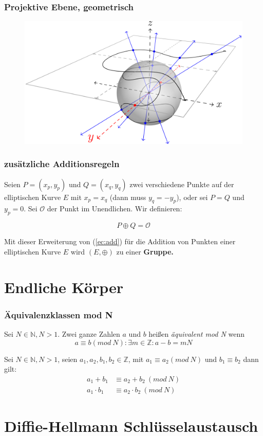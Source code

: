 \documentclass{beamer}
\begin{document}
\begin{frame}
  \frametitle{Projektive Ebene, geometrisch}
  \begin{figure}
    \includegraphics[height=0.57\textwidth]{ell-curve-projective.png}
  \end{figure}
\end{frame}
\begin{frame}
  \frametitle{zusätzliche Additionsregeln}
  \begin{definition}
    Seien $P = (x_p, y_p)$ und $Q =(x_q, y_q)$ zwei verschiedene Punkte auf der
    elliptischen Kurve $E$ mit $x_p = x_q$ (dann muss $y_q = -y_p$),
    oder sei $P = Q$ und $y_p = 0$.
    Sei $\mathcal{O}$ der Punkt im Unendlichen. Wir definieren:

    $$ P \oplus Q = \mathcal{O} $$
  \end{definition}
  \begin{Theorem}
    Mit dieser Erweiterung von (\ref{ec:add}) für die Addition von Punkten einer
    elliptischen Kurve $E$ wird $(E, \oplus)$ zu einer \bf{Gruppe}.
  \end{Theorem}
\end{frame}

\section{Endliche Körper}
\begin{frame}
  \frametitle{Äquivalenzklassen mod N}
  \begin{definition}
    Sei $N \in \mathbb{N}, N > 1$. Zwei ganze Zahlen $a$ und $b$ heißen
    \emph{äquivalent mod N} wenn
    $$ a \equiv b (mod\ N): \exists m \in \mathbb{Z}: a-b = mN $$
  \end{definition}

  \begin{lemma}
    Sei $N \in \mathbb{N}, N > 1$, seien $a_1, a_2, b_1, b_2 \in \mathbb{Z}$,
    mit $a_1 \equiv a_2 (mod\ N)$ und $b_1 \equiv b_2$  dann gilt:
    \begin{equation}
      \begin{split}
        \label{op:mod}
        a_1 + b_1 & \equiv  a_2 + b_2 \ (mod\ N) \\
        a_1 \cdot b_1 & \equiv  a_2 \cdot b_2 \ (mod\ N)
      \end{split}
    \end{equation}
  \end{lemma}
\end{frame}

\section{Diffie-Hellmann Schlüsselaustausch}
\begin{frame}
  \tableofcontents
\end{frame}
\end{document}
